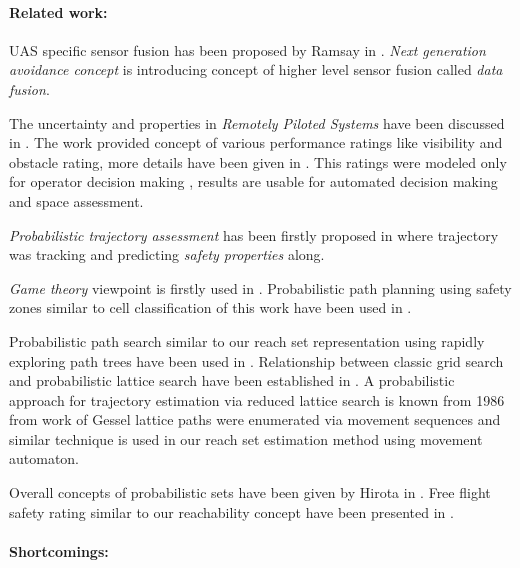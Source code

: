 \paragraph{Related work:} \noindent UAS specific sensor fusion has been proposed by Ramsay in \cite{ramasamy2014avionics}. \emph{Next generation avoidance concept} \cite{ramasamy2014next} is introducing concept of higher level sensor fusion called \emph{data fusion}. 

The uncertainty and properties in \emph{Remotely Piloted Systems} have been discussed in \cite{chynchenko2016remotely}. The work provided concept of various performance ratings like visibility and obstacle rating, more details have been given in \cite{shmelova2016modeling}. This ratings were modeled only for operator decision making \cite{kharchenko2017modelling}, results are usable for automated decision making and space assessment. 

\emph{Probabilistic trajectory assessment} has been firstly proposed in \cite{kim2007uav} where trajectory was tracking and predicting \emph{safety properties} along. 

\emph{Game theory} viewpoint is firstly used in \cite{vidal2002probabilistic}. Probabilistic path planning using safety zones similar to cell classification of this work have been used in \cite{pfeiffer2005path}.

Probabilistic path search similar to our reach set representation using rapidly exploring path trees have been used in \cite{kothari2013probabilistically,blackmore2006probabilistic}. Relationship between classic grid search and probabilistic lattice search have been established in \cite{lavalle2004relationship}. A probabilistic approach for trajectory estimation via reduced lattice search is known from 1986 from work of Gessel \cite{gessel1986probabilistic} lattice paths were enumerated via movement sequences and similar technique is used in our reach set estimation method using movement automaton. 

Overall concepts of probabilistic sets have been given by Hirota in \cite{hirota1981concepts}.  Free flight safety rating similar to our reachability concept have been presented in \cite{hoekstra2002designing}.

\paragraph{Shortcomings:} 

